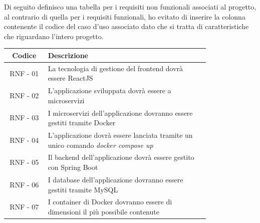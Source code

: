 Di seguito definisco una tabella per i requisiti non funzionali associati al progetto, al contrario di quella per i requisiti funzionali, ho evitato di inserire la colonna contenente il codice del caso d'uso associato dato che si tratta di caratteristiche che riguardano l'intero progetto.

\begin{center}
    \begin{tabular}{|c|p{0.8\linewidth}|}
    \hline
    \textbf{Codice} & \textbf{Descrizione} \\
    \hline
    \rowcolor{Violet}
    RNF - 01 & La tecnologia di gestione del frontend dovrà essere ReactJS \\
    \hline
    \rowcolor{LightViolet}
    RNF - 02 & L'applicazione sviluppata dovrà essere a microservizi \\
    \hline
    \rowcolor{LightViolet}
    RNF - 03 & I microservizi dell'applicazione dovranno essere gestiti tramite Docker \\
    \hline    
    \rowcolor{Violet}
    RNF - 04 & L'applicazione dovrà essere lanciata tramite un unico comando \emph{docker compose up} \\
    \hline
    \rowcolor{LighterViolet}
    RNF - 05 & Il backend dell'applicazione dovrà essere gestito con Spring Boot \\
    \hline
    \rowcolor{LighterViolet}
    RNF - 06 & I database dell'applicazione dovranno essere gestiti tramite MySQL \\
    \hline
    \rowcolor{DarkViolet}
    RNF - 07 & I container di Docker dovranno essere di dimensioni il più possibile contenute
    \end{tabular}
\end{center}



